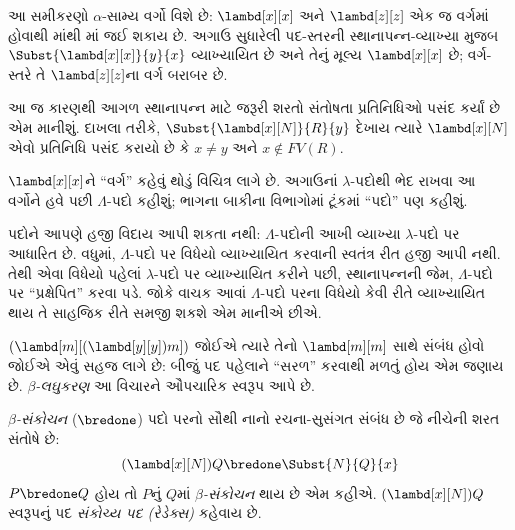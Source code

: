 આ સમીકરણો $\alpha$-સામ્ય વર્ગો વિશે છે: $\lambd[x][x]$
અને $\lambd[z][z]$ એક જ વર્ગમાં હોવાથી
માંથી માં જઈ શકાય છે. અગાઉ
સુધારેલી પદ-સ્તરની સ્થાનાપન્ન-વ્યાખ્યા મુજબ
$\Subst{\lambd[x][x]}{y}{x}$ વ્યાખ્યાયિત છે અને
તેનું મૂલ્ય $\lambd[x][x]$ છે; વર્ગ-સ્તરે તે
$\lambd[z][z]$ના વર્ગ બરાબર છે.

આ જ કારણથી આગળ સ્થાનાપન્ન માટે જરૂરી શરતો
સંતોષતા પ્રતિનિધિઓ પસંદ કર્યાં છે એમ માનીશું. દાખલા તરીકે,
$\Subst{\lambd[x][N]}{R}{y}$ દેખાય ત્યારે
$\lambd[x][N]$ એવો પ્રતિનિધિ પસંદ કરાયો છે કે
$x \neq y$ અને $x \notin FV(R)$.

$\lambd[x][x]$ને ``વર્ગ'' કહેવું થોડું વિચિત્ર લાગે છે.
અગાઉનાં $\lambda$-પદોથી ભેદ રાખવા આ વર્ગોને હવે પછી
$\Lambda$-પદો કહીશું; ભાગના બાકીના વિભાગોમાં ટૂંકમાં
``પદો'' પણ કહીશું.

\begin{editorial}
  પદોને આપણે હજી વિદાય આપી શકતા નથી: $\Lambda$-પદોની
  આખી વ્યાખ્યા $\lambda$-પદો પર આધારિત છે. વધુમાં,
  $\Lambda$-પદો પર વિધેયો વ્યાખ્યાયિત કરવાની સ્વતંત્ર
  રીત હજી આપી નથી. તેથી એવા વિધેયો પહેલાં
  $\lambda$-પદો પર વ્યાખ્યાયિત કરીને પછી, સ્થાનાપન્નની
  જેમ, $\Lambda$-પદો પર ``પ્રક્ષેપિત'' કરવા પડે.
  જોકે વાચક આવાં $\Lambda$-પદો પરના વિધેયો કેવી રીતે વ્યાખ્યાયિત થાય તે
  સાહજિક રીતે સમજી શકશે એમ માનીએ છીએ.
\end{editorial}
\endgroup


\begingroup
\makeatletter{}\makeatother

\label{guunit:OLP-0365}


$(\lambd[m][(\lambd[y][y]) m])$ જોઈએ ત્યારે તેનો
$\lambd[m][m]$ સાથે સંબંધ હોવો જોઈએ એવું સહજ લાગે છે:
બીજું પદ પહેલાને ``સરળ'' કરવાથી મળતું હોય એમ જણાય છે.
\emph{$\beta$-લઘુકરણ} આ વિચારને ઔપચારિક સ્વરૂપ આપે છે.

\begin{defn} 
  \emph{$\beta$-સંકોચન} ($\bredone$) પદો પરનો સૌથી
  નાનો રચના-સુસંગત સંબંધ છે જે નીચેની શરત સંતોષે છે:
  \[
    (\lambd[x][N])Q \bredone \Subst{N}{Q}{x} 
  \]
  $P \bredone Q$ હોય તો $P$નું $Q$માં
  \emph{$\beta$-સંકોચન} થાય છે એમ કહીએ. $(\lambd[x][N])Q$
  સ્વરૂપનું પદ \emph{સંકોચ્ય પદ (રેડેક્સ)} કહેવાય છે.
\end{defn}

